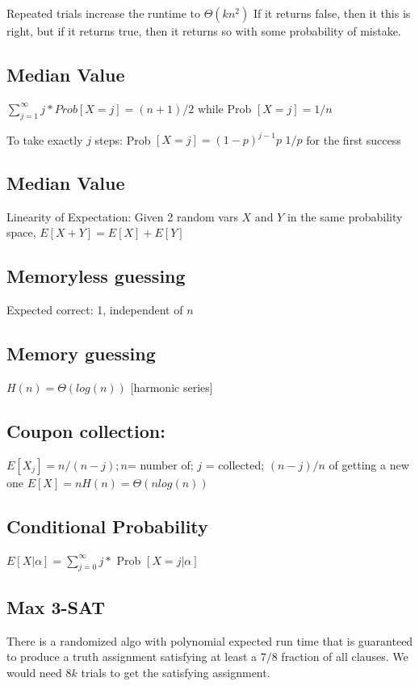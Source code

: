 Repeated trials increase the runtime to $\Theta(kn^2)$
If it returns false, then it this is right, but if it returns true, then it returns so with some probability of mistake.


\subsection{Median Value}
$\sum_{j=1}^{\infty}  j * Prob[ X = j ]  = (n + 1) / 2$ while Prob $[X = j] = 1/n$

To take exactly $j$ steps: Prob $[X = j] = (1 - p)^{j - 1} p$
$1/p$ for the first success

\subsection{Median Value}
Linearity of Expectation: Given 2 random vars $X$ and $Y$ in the same probability space, $E [X + Y] = E[ X ] + E [ Y ] $

\subsection{Memoryless guessing}
Expected correct: 1, independent of $n$

\subsection{Memory guessing}
$H(n) = \Theta(log(n))$ [harmonic series]

\subsection{Coupon collection:}
$E[ X_{j}] = n / (n - j); n $= number of; $j$ = collected; $( n - j ) / n$ of getting a new one
$E[X] = nH(n) = \Theta(nlog(n))$

\subsection{Conditional Probability}
$E[ X | \alpha ] =  \sum_{j=0}^{\infty} j *$ Prob $[ X = j | \alpha]$

\subsection{Max 3-SAT}
There is a randomized algo with polynomial expected run time that is guaranteed to produce a truth assignment satisfying at least a $7/8$ fraction of all clauses. We would need $8k$ trials to get the satisfying assignment.

